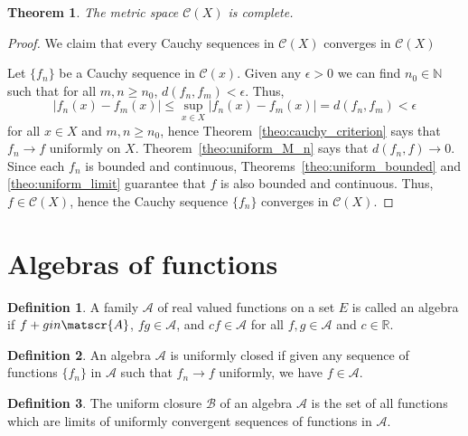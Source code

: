 \documentclass[11pt]{article}
\def\R{\mathbb{R}}
\def\N{\mathbb{N}}
\newtheorem{theorem}{Theorem}[section]
\theoremstyle{definition}
\newtheorem{definition}{Definition}[section]
\theoremstyle{remark}
\begin{document}
    \begin{theorem}
        The metric space $\mathscr{C}(X)$ is complete.
    \end{theorem}
    \begin{proof}
        We claim that every Cauchy sequences in $\mathscr{C}(X)$ converges in
        $\mathscr{C}(X)$

        Let $\{f_n\}$ be a Cauchy sequence in $\mathscr{C}(x)$. Given any $\epsilon >
        0$ we can find $n_0 \in \N$ such that for all $m, n \geq n_0$, $d(f_n, f_m) <
        \epsilon$. Thus, \[
            |f_n(x) - f_m(x)| \leq \sup_{x \in X} |f_n(x) - f_m(x)| = d(f_n, f_m)<
            \epsilon
        \] for all $x \in X$ and $m, n \geq n_0$, hence
        Theorem~\ref{theo:cauchy_criterion} says that $f_n \to f$ uniformly on $X$.
        Theorem~\ref{theo:uniform_M_n} says that $d(f_n, f) \to 0$.  Since each $f_n$
        is bounded and continuous, Theorems~\ref{theo:uniform_bounded} and
        \ref{theo:uniform_limit} guarantee that $f$ is also bounded and continuous.
        Thus, $f \in \mathscr{C}(X)$, hence the Cauchy sequence $\{f_n\}$ converges
        in $\mathscr{C}(X)$.
    \end{proof}

    \section{Algebras of functions}
    \begin{definition}
        A family $\mathscr{A}$ of real valued functions on a set $E$ is called an
        algebra if $f + g \\in \matscr{A}$, $fg \in \mathscr{A}$, and $cf \in
        \mathscr{A}$ for all $f, g\in \mathscr{A}$ and $c \in \R$.
    \end{definition}

    \begin{definition}
        An algebra $\mathscr{A}$ is uniformly closed if given any sequence of
        functions $\{f_n\}$ in $\mathscr{A}$ such that $f_n \to f$ uniformly, we have
        $f \in \mathscr{A}$.
    \end{definition}

    \begin{definition}
        The uniform closure $\mathscr{B}$ of an algebra $\mathscr{A}$ is the set of
        all functions which are limits of uniformly convergent sequences of functions
        in $\mathscr{A}$.
    \end{definition}
\end{document}

